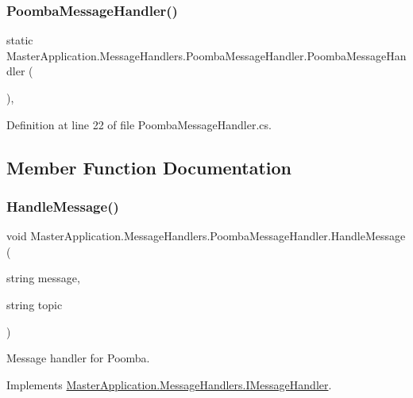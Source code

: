 \subsubsection{\texorpdfstring{Poomba\+Message\+Handler()}{PoombaMessageHandler()}}
{\footnotesize\ttfamily static Master\+Application.\+Message\+Handlers.\+Poomba\+Message\+Handler.\+Poomba\+Message\+Handler (\begin{DoxyParamCaption}{ }\end{DoxyParamCaption})\hspace{0.3cm}{\ttfamily [static]}, {\ttfamily [private]}}



Definition at line 22 of file Poomba\+Message\+Handler.\+cs.



\subsection{Member Function Documentation}
\mbox{\label{class_master_application_1_1_message_handlers_1_1_poomba_message_handler_a2c49a00a1f9cad8e67d799be49b476a2}} 
\subsubsection{\texorpdfstring{Handle\+Message()}{HandleMessage()}}
{\footnotesize\ttfamily void Master\+Application.\+Message\+Handlers.\+Poomba\+Message\+Handler.\+Handle\+Message (\begin{DoxyParamCaption}\item[{string}]{message,  }\item[{string}]{topic }\end{DoxyParamCaption})}



Message handler for Poomba. 



Implements \mbox{\hyperlink{interface_master_application_1_1_message_handlers_1_1_i_message_handler_ada3ca8e0f5f2801663822849a2cfdf40}{Master\+Application.\+Message\+Handlers.\+I\+Message\+Handler}}.



